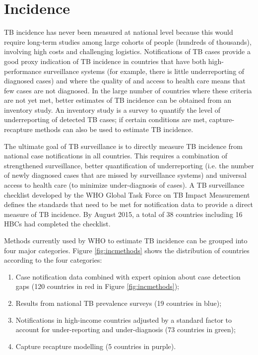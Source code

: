 \section{Incidence}

TB incidence has never been measured at national level because this would require long-term studies among large cohorts of people (hundreds of thousands), involving high costs and challenging logistics. Notifications of TB cases provide a good proxy indication of TB incidence in countries that have both high-performance surveillance systems (for example, there is little underreporting of diagnosed cases) and where the quality of and access to health care means that few cases are not diagnosed. In the large number of countries where these criteria are not yet met, better estimates of TB incidence can be obtained from an inventory study. An inventory study is a survey to quantify the level of underreporting of detected TB cases; if certain conditions are met, capture-recapture methods can also be used to estimate TB incidence\cite{WHO2012}. 

The ultimate goal of TB surveillance is to directly measure TB incidence from national case notifications in all countries. This requires a combination of strengthened surveillance, better quantification of underreporting (i.e. the number of newly diagnosed cases that are missed by surveillance systems) and universal access to health care (to minimize under-diagnosis of cases). A TB surveillance checklist developed by the WHO Global Task Force on TB Impact Measurement defines the standards that need to be met for notification data to provide a direct measure of TB incidence\cite{WHO2014}. By August 2015, a total of 38 countries including 16 HBCs had completed the checklist. 

Methods currently used by WHO to estimate TB incidence can be grouped into four major categories. Figure \ref{fig:incmethods} shows the distribution of countries according to the four categories: 

\begin{enumerate}
\item Case notification data combined with expert opinion about case detection gaps (120 countries in red in Figure \ref{fig:incmethods});
\item Results from national TB prevalence surveys (19 countries in blue);
\item Notifications in high-income countries adjusted by a standard factor to account for under-reporting and under-diagnosis (73 countries in green);
\item Capture recapture modelling (5 countries in purple).
\end{enumerate}






  
  
  
  
  
  
  
  
  
  